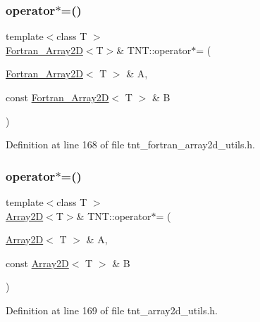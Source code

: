 \subsubsection{\texorpdfstring{operator$\ast$=()}{operator*=()}\hspace{0.1cm}{\footnotesize\ttfamily [3/5]}}
{\footnotesize\ttfamily template$<$class T $>$ \\
\hyperlink{classTNT_1_1Fortran__Array2D}{Fortran\+\_\+\+Array2D}$<$T$>$\& T\+N\+T\+::operator$\ast$= (\begin{DoxyParamCaption}\item[{\hyperlink{classTNT_1_1Fortran__Array2D}{Fortran\+\_\+\+Array2D}$<$ T $>$ \&}]{A,  }\item[{const \hyperlink{classTNT_1_1Fortran__Array2D}{Fortran\+\_\+\+Array2D}$<$ T $>$ \&}]{B }\end{DoxyParamCaption})}



Definition at line 168 of file tnt\+\_\+fortran\+\_\+array2d\+\_\+utils.\+h.

\mbox{\label{namespaceTNT_a5d9f342f2de5edc0fce4481982924e44}} 
\subsubsection{\texorpdfstring{operator$\ast$=()}{operator*=()}\hspace{0.1cm}{\footnotesize\ttfamily [4/5]}}
{\footnotesize\ttfamily template$<$class T $>$ \\
\hyperlink{classTNT_1_1Array2D}{Array2D}$<$T$>$\& T\+N\+T\+::operator$\ast$= (\begin{DoxyParamCaption}\item[{\hyperlink{classTNT_1_1Array2D}{Array2D}$<$ T $>$ \&}]{A,  }\item[{const \hyperlink{classTNT_1_1Array2D}{Array2D}$<$ T $>$ \&}]{B }\end{DoxyParamCaption})}



Definition at line 169 of file tnt\+\_\+array2d\+\_\+utils.\+h.

\mbox{\label{namespaceTNT_a6390e0158dfa25e89cb28bb196ac9dc6}} 
